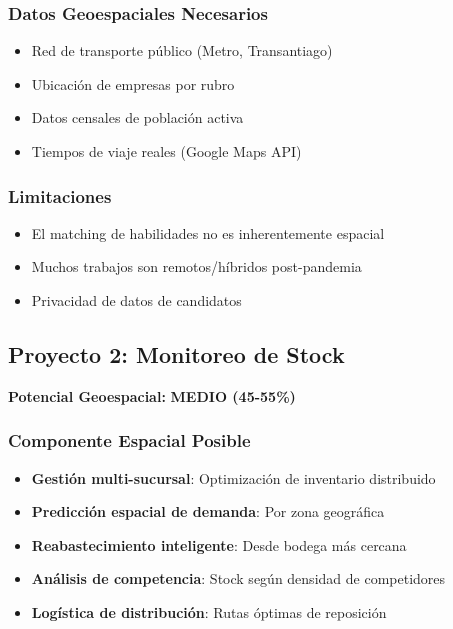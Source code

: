 \documentclass[11pt,a4paper]{article}
\newcommand{\medio}[1]{\textcolor{amarillo}{\textbf{#1}}}
\begin{document}
\subsubsection{Datos Geoespaciales Necesarios}
\begin{itemize}
    \item Red de transporte público (Metro, Transantiago)
    \item Ubicación de empresas por rubro
    \item Datos censales de población activa
    \item Tiempos de viaje reales (Google Maps API)
\end{itemize}

\subsubsection{Limitaciones}
\begin{itemize}
    \item El matching de habilidades no es inherentemente espacial
    \item Muchos trabajos son remotos/híbridos post-pandemia
    \item Privacidad de datos de candidatos
\end{itemize}

\newpage

\subsection{Proyecto 2: Monitoreo de Stock}

\begin{tcolorbox}[colframe=amarillo,colback=yellow!10]
\textbf{Potencial Geoespacial:} \medio{MEDIO (45-55\%)}
\end{tcolorbox}

\subsubsection{Componente Espacial Posible}

\begin{itemize}
    \item \textbf{Gestión multi-sucursal}: Optimización de inventario distribuido
    \item \textbf{Predicción espacial de demanda}: Por zona geográfica
    \item \textbf{Reabastecimiento inteligente}: Desde bodega más cercana
    \item \textbf{Análisis de competencia}: Stock según densidad de competidores
    \item \textbf{Logística de distribución}: Rutas óptimas de reposición
\end{itemize}
\end{document}
